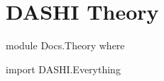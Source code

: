 \documentclass{article}
\begin{document}
\section*{DASHI Theory}

\begin{code}
module Docs.Theory where

import DASHI.Everything
\end{code}
\end{document}
